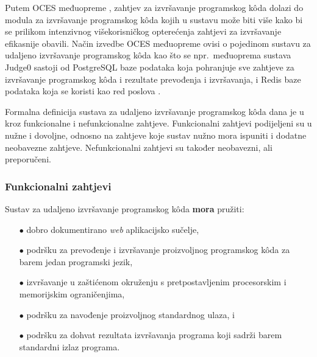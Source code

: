 \documentclass[times, utf8, diplomski]{fer}
\begin{document}
\pagebreak

Putem OCES međuopreme , zahtjev za izvršavanje programskog kôda dolazi do modula za izvršavanje programskog kôda kojih u sustavu može biti više kako bi se prilikom intenzivnog višekorisničkog opterećenja zahtjevi za izvršavanje efikasnije obavili. Način izvedbe OCES međuopreme ovisi o pojedinom sustavu za udaljeno izvršavanje programskog kôda kao što se npr.\ međuoprema sustava Judge0 sastoji od PostgreSQL baze podataka koja pohranjuje sve zahtjeve za izvršavanje programskog kôda i rezultate prevođenja i izvršavanja, i Redis baze podataka koja se koristi kao red poslova  \citep{9245310}.

Formalna definicija sustava za udaljeno izvršavanje programskog kôda dana je u \citep{9245310} kroz funkcionalne i nefunkcionalne zahtjeve. Funkcionalni zahtjevi podijeljeni su u nužne i dovoljne, odnosno na zahtjeve koje sustav nužno mora ispuniti i dodatne neobavezne zahtjeve. Nefunkcionalni zahtjevi su također neobavezni, ali preporučeni.

\subsubsection{Funkcionalni zahtjevi}
Sustav za udaljeno izvršavanje programskog kôda \textbf{mora} pružiti:
\begin{itemize}
    \item[$\bullet$] dobro dokumentirano \textit{web} aplikacijsko sučelje,
    \item[$\bullet$] podršku za prevođenje i izvršavanje proizvoljnog programskog kôda za barem jedan programski jezik,
    \item[$\bullet$] izvršavanje u zaštićenom okruženju s pretpostavljenim procesorskim i memorijskim ograničenjima,
    \item[$\bullet$] podršku za navođenje proizvoljnog standardnog ulaza, i
    \item[$\bullet$] podršku za dohvat rezultata izvršavanja programa koji sadrži barem standardni izlaz programa.
\end{itemize}
\end{document}

